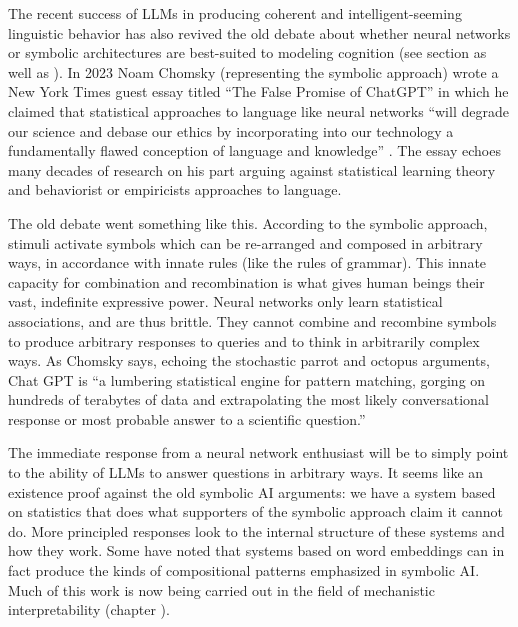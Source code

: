 The recent success of LLMs in producing coherent and intelligent-seeming
linguistic behavior has also revived the old debate about whether neural
networks or symbolic architectures are best-suited to modeling cognition (see
section  as well as \cite{king2024large}). In 2023 Noam Chomsky
(representing the symbolic approach) wrote a New York Times guest essay titled
``The False Promise of ChatGPT'' in which he claimed that statistical
approaches to language like neural networks ``will degrade our science and
debase our ethics by incorporating into our technology a fundamentally flawed
conception of language and knowledge'' \cite{chomsky2023noam}. The essay echoes
many decades of research on his part arguing against statistical learning
theory and behaviorist or empiricists approaches to language. 

The old debate went something like this. According to the symbolic approach,
stimuli activate symbols which can be re-arranged and composed in arbitrary
ways, in accordance with innate rules (like the rules of grammar). This innate
capacity for combination and recombination is what gives human beings their
vast, indefinite expressive power. Neural networks only learn statistical
associations, and are thus brittle. They cannot combine and recombine symbols
to produce arbitrary responses to queries and to think in arbitrarily complex
ways. As Chomsky says, echoing the stochastic parrot and octopus arguments,
Chat GPT is ``a lumbering statistical engine for pattern matching, gorging on
hundreds of terabytes of data and extrapolating the most likely conversational
response or most probable answer to a scientific question.''

The immediate response from a neural network enthusiast will be to simply point
to the ability of LLMs to answer questions in arbitrary ways. It seems like an
existence proof against the old symbolic AI arguments: we have a system based
on statistics that does what supporters of the symbolic approach claim it
cannot do. More principled responses look to the internal structure of these
systems and how they work. Some have noted that systems based on word
embeddings can in fact produce the kinds of compositional patterns emphasized
in symbolic AI. Much of this work is now being carried out in the field of
mechanistic interpretability (chapter ). 

